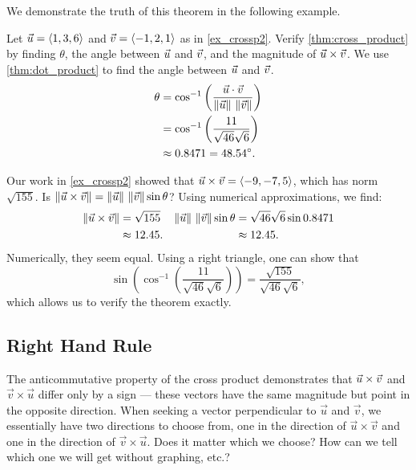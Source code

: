 We demonstrate the truth of this theorem in the following example.

\begin{example}\label{ex_crossp3}%
Let $\vec u =\left\langle 1,3,6\right\rangle$ and $\vec v = \left\langle -1,2,1\right\rangle$ as in \autoref{ex_crossp2}. Verify \autoref{thm:cross_product} by finding $\theta$, the angle between $\vec u$ and $\vec v$, and the magnitude of $\vec u\times\vec v$.
\solution
We use \autoref{thm:dot_product} to find the angle between $\vec u$ and $\vec v$. 
\begin{align*}
\theta &= \cos^{-1}\left(\frac{\vec u\cdot\vec v}{\left\lVert \vec u \right\rVert\, \left\lVert \vec v \right\rVert}\right) \\
			&= \cos^{-1}\left(\frac{11}{\sqrt{46}\sqrt{6}}\right)\\
			&\approx 0.8471 = 48.54^\circ.
\end{align*}

Our work in \autoref{ex_crossp2} showed that $\vec u\times\vec v = \left\langle -9,-7,5\right\rangle$, which has norm $\sqrt{155}.$ Is $\left\lVert \vec u\times\vec v \right\rVert = \left\lVert \vec u \right\rVert\, \left\lVert \vec v \right\rVert\sin\theta$? Using numerical approximations, we find:
\begin{align*}
\left\lVert \vec u\times\vec v \right\rVert
 &=\sqrt{155}  & \left\lVert \vec u \right\rVert\,\left\lVert \vec v \right\rVert \sin\theta & = \sqrt{46}\sqrt{6}\sin 0.8471\\
 &\approx 12.45. & &\approx 12.45.
\end{align*}
Numerically, they seem equal. Using a right triangle, one can show that 
\[\sin\left(\cos^{-1}\left(\frac{11}{\sqrt{46}\sqrt{6}}\right)\right) = \frac{\sqrt{155}}{\sqrt{46}\sqrt{6}},\]
which allows us to verify the theorem exactly.
\end{example}

\subsection{Right Hand Rule}

The anticommutative property of the cross product demonstrates that $\vec u\times\vec v$ and $\vec v\times\vec u$ differ only by a sign --- these vectors have the same magnitude but point in the opposite direction. When seeking a vector perpendicular to $\vec u$ and $\vec v$, we essentially have two directions to choose from, one in the direction of $\vec u\times\vec v$ and one in the direction of $\vec v\times\vec u$. Does it matter which we choose? How can we tell which one we will get without graphing, etc.?


